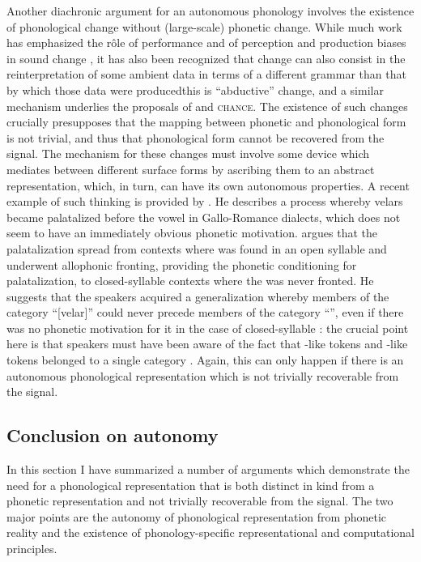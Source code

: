 Another diachronic argument for an autonomous phonology involves the existence of phonological change without (large\hyp scale) phonetic change. While much work has emphasized the rôle of performance and of perception and production biases in sound change \citep[\egm][]{ohala1981,blevins}, it has also been recognized that change can also consist in the reinterpretation of some ambient data in terms of a different grammar than that by which those data were produced\dash this is  \enquote{abductive} change, and a similar mechanism underlies the proposals of \citet{hale03:_neogr,hale07:_histor} and  \textsc{chance}. The existence of such changes crucially presupposes that the mapping between phonetic and phonological form is not trivial, and thus that phonological form cannot be recovered from the signal. The mechanism for these changes must involve some device which mediates between different surface forms by ascribing them to an abstract representation, which, in turn, can have its own autonomous properties. A recent example of such thinking is provided by \citet{buckley09:_phonet_gallo_roman}. He describes a process whereby velars became palatalized before the vowel \ipa{[a]} in Gallo\hyp Romance dialects, which does not seem to have an immediately obvious phonetic motivation. \citet{buckley09:_phonet_gallo_roman} argues that the palatalization spread from contexts where \ipa{[a]} was found in an open syllable and underwent allophonic fronting, providing the phonetic conditioning for palatalization, to closed\hyp syllable contexts where the \ipa{[a]} was never fronted. He suggests that the speakers acquired a generalization whereby members of the category \enquote{[velar]} could never precede members of the category \enquote{\ipa{[a]}}, even if there was no phonetic motivation for it in the case of closed\hyp syllable \ipa{[a]}: the crucial point here is that speakers must have been aware of the fact that -like tokens and -like tokens belonged to a single category . Again, this can only happen if there is an autonomous phonological representation which is not trivially recoverable from the signal.

\subsection{Conclusion on autonomy}
\label{sec:conclusion-autonomy}

In this section I have summarized a number of arguments which demonstrate the need for a phonological representation that is both distinct in kind from a phonetic representation \citep[\cfm][]{keating90:_phonet,phon-knowledge} and not trivially recoverable from the signal. The two major points are the autonomy of phonological representation from phonetic reality and the existence of phonology\hyp specific representational and computational principles.

